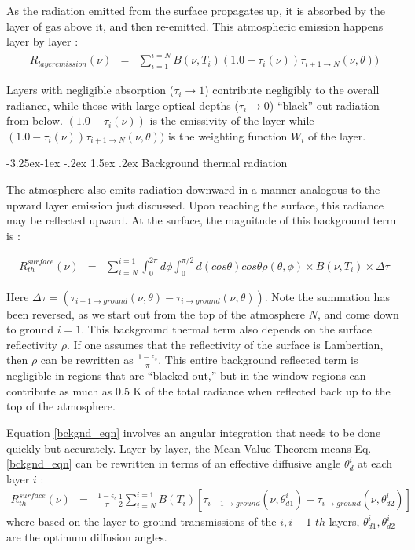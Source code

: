 \documentclass[11pt]{article}
\makeatletter
\renewcommand{\subsection}{\@startsection{subsection}{2}{\z@}%
                                     {-3.25ex\@plus -1ex \@minus -.2ex}%
                                     {1.5ex \@plus .2ex}%
                                     {\reset@font\normalsize\bfseries}}
\makeatother
\begin{document}
As the radiation emitted from the surface propagates up, it is absorbed by
the layer of gas above it, and then re-emitted. This atmospheric emission
happens layer by layer :
\begin{eqnarray*}
R_{layer emission}(\nu) & = & \sum_{i=1}^{i=N} B(\nu,T_{i})
(1.0 - \tau_{i}(\nu)) \tau_{i+1 \rightarrow N}(\nu,\theta))
\end{eqnarray*}

Layers with negligible absorption ($\tau_{i} \rightarrow 1$) contribute
negligibly to the overall radiance, while those with large optical depths
 ($\tau_{i} \rightarrow 0$) ``black'' out radiation from below.
$(1.0 - \tau_{i}(\nu))$ is the emissivity of the layer while
$(1.0 - \tau_{i}(\nu)) \tau_{i+1 \rightarrow N}(\nu,\theta))$ is the weighting
function $W_{i}$ of the layer.

\subsection{Background thermal radiation}

The atmosphere also emits radiation downward in a manner analogous to the
upward layer emission just discussed. Upon reaching the surface, this
radiance may be reflected upward. At the surface, the magnitude of this
background term is :

\begin{eqnarray}
R_{th}^{surface}(\nu) & = & \sum_{i=N}^{i=1}
\int_{0}^{2\pi}d\phi
\int_{0}^{\pi/2} d(cos\theta) cos\theta \rho(\theta,\phi)
\times B(\nu,T_{i}) \times \Delta \tau
\label{bckgnd_eqn}
\end{eqnarray}

\noindent Here $ \Delta \tau = (\tau_{i-1 \rightarrow ground}(\nu,\theta)-
 \tau_{i \rightarrow ground}(\nu,\theta))$.
Note the summation has been reversed, as we start out from the top of the
atmosphere $N$, and come down to ground $i=1$.
This background thermal term also depends on the surface reflectivity $\rho$.
If one assumes that the reflectivity of the surface is Lambertian, then $\rho$
can be rewritten as $\frac{1 - \epsilon_{s}}{\pi}$. This entire background
reflected term is negligible in regions that are ``blacked out,'' but in
the window regions can contribute as much as 0.5 K of the total radiance when
reflected back up to the top of the atmosphere.

Equation \ref{bckgnd_eqn} involves an angular integration that needs to
be done quickly but accurately. Layer by layer, the
Mean Value Theorem means Eq. \ref{bckgnd_eqn} can be rewritten in terms of an
effective diffusive angle $\theta^{i}_{d}$ at each layer $i$ :
\begin{eqnarray*}
R_{th}^{surface}(\nu) & =
                 & \frac{1 - \epsilon_{s}}{\pi} \frac{1}{2} \sum_{i=N}^{i=1}
B(T_{i}) \left[ \tau_{i-1 \rightarrow ground}
(\nu,\theta^{i}_{d1})-\tau_{i \rightarrow ground}(\nu,\theta^{i}_{d2}) \right]
\end{eqnarray*}
where based on the layer to ground transmissions of the $i,i-1$ $th$
layers,  $\theta^{i}_{d1},\theta^{i}_{d2}$ are the optimum diffusion angles.
\end{document}
